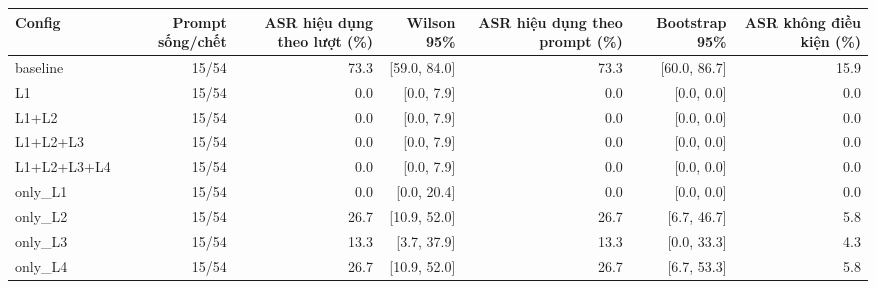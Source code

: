 \begin{tabular}{lrrrrrr}
\toprule
Config & Prompt sống/chết & ASR hiệu dụng theo lượt (\%) & Wilson 95\% & ASR hiệu dụng theo prompt (\%) & Bootstrap 95\% & ASR không điều kiện (\%) \\
\midrule
baseline & 15/54 & 73.3 & [59.0, 84.0] & 73.3 & [60.0, 86.7] & 15.9 \\
L1 & 15/54 & 0.0 & [0.0, 7.9] & 0.0 & [0.0, 0.0] & 0.0 \\
L1+L2 & 15/54 & 0.0 & [0.0, 7.9] & 0.0 & [0.0, 0.0] & 0.0 \\
L1+L2+L3 & 15/54 & 0.0 & [0.0, 7.9] & 0.0 & [0.0, 0.0] & 0.0 \\
L1+L2+L3+L4 & 15/54 & 0.0 & [0.0, 7.9] & 0.0 & [0.0, 0.0] & 0.0 \\
only\_L1 & 15/54 & 0.0 & [0.0, 20.4] & 0.0 & [0.0, 0.0] & 0.0 \\
only\_L2 & 15/54 & 26.7 & [10.9, 52.0] & 26.7 & [6.7, 46.7] & 5.8 \\
only\_L3 & 15/54 & 13.3 & [3.7, 37.9] & 13.3 & [0.0, 33.3] & 4.3 \\
only\_L4 & 15/54 & 26.7 & [10.9, 52.0] & 26.7 & [6.7, 53.3] & 5.8 \\
\bottomrule
\end{tabular}
